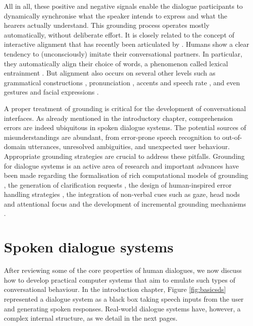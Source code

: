 All in all, these positive and negative signals enable the dialogue participants to dynamically synchronise what the speaker intends to express and what the hearers actually understand.   This grounding process operates mostly automatically, without deliberate effort.  It is closely related to the concept of interactive alignment that has recently been articulated by \cite{Garrod2004,Garrod2009}. Humans show a clear tendency to (unconsciously) imitate their conversational partners. In particular, they automatically align their choice of words, a phenomenon called lexical entrainment \citep{brennan1996conceptual}.  But alignment also occurs on several other levels such as grammatical constructions \citep{branigan2000syntactic}, pronunciation \citep{pardo2006phonetic}, accents and speech rate \citep{giles19911}, and even gestures and facial expressions \citep{bavelas1986show}.  

A proper treatment of grounding is critical for the development of conversational interfaces.  As already mentioned in the introductory chapter, comprehension errors are indeed ubiquitous in spoken dialogue systems.  The potential sources of misunderstandings are abundant, from error-prone speech recognition to out-of-domain utterances, unresolved ambiguities, and unexpected user behaviour.  Appropriate grounding strategies are crucial to address these pitfalls. Grounding for dialogue systems is an active area of research and important advances have been made regarding the formalisation of rich computational models of grounding \citep{Traum:1994thesis,MathesonPT00}, the generation of clarification requests \citep{Purver04Thesis,Rieser:2005}, the design of human-inspired error handling strategies \citep{Skantze2007}, the integration of non-verbal cues such as gaze, head nods and attentional focus \citep{Nakano:2003} and the development of incremental grounding mechanisms \citep{visser_toward_2012}.

\section{Spoken dialogue systems}
\label{sec:sds}

After reviewing some of the core properties of human dialogues, we now discuss how to develop practical computer systems that aim to emulate such types of conversational behaviour.   In the introduction chapter, Figure \ref{fig:basicsds} represented a dialogue system as a black box taking speech inputs from the user and generating spoken responses.  Real-world dialogue systems have, however, a complex internal structure, as we detail in the next pages.

